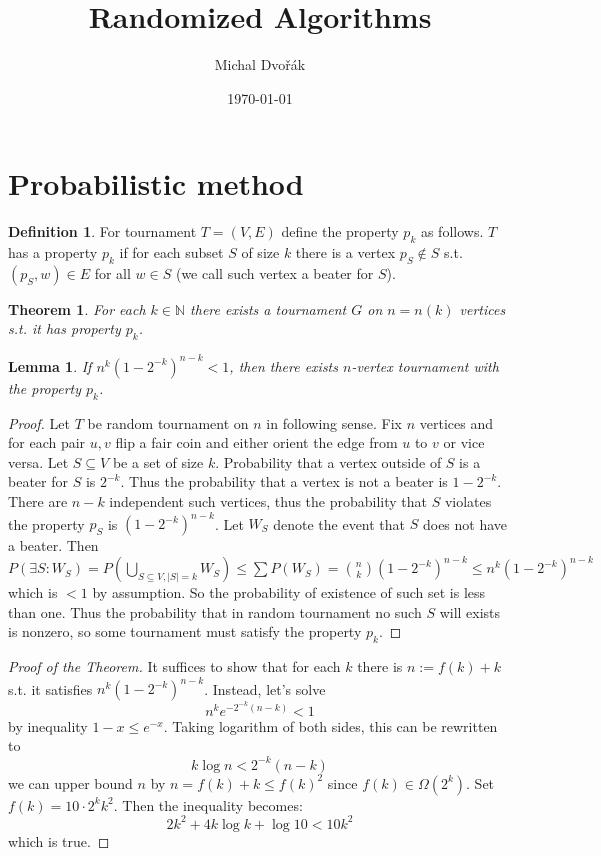 \documentclass{article}
\title{Randomized Algorithms}
\author{Michal Dvořák}
\date{\today}
\theoremstyle{plain}
\newtheorem{thm}{Theorem}
\newtheorem{lem}{Lemma}[thm]
\theoremstyle{definition}
\newtheorem{defn}{Definition}
\begin{document}
\maketitle

\section{Probabilistic method}

\begin{defn}
	For tournament $T=(V,E)$ define the property $p_k$ as follows. $T$ has a property $p_k$ if for each subset $S$ of size $k$ there is a vertex $p_S\notin S$ s.t. $(p_S,w)\in E$ for all $w\in S$ (we call such vertex a beater for $S$). 
\end{defn}

\begin{thm}
	For each $k\in\mathbb{N}$ there exists a tournament $G$ on $n=n(k)$ vertices s.t. it has property $p_k$.
\end{thm}

\begin{lem}
	If $n^k(1-2^{-k})^{n-k} < 1$, then there exists $n$-vertex tournament with the property $p_k$.
\end{lem}
\begin{proof}
	Let $T$ be random tournament on $n$ in following sense. Fix $n$ vertices and for each pair $u,v$ flip a fair coin and either orient the edge from $u$ to $v$ or vice versa. Let $S\subseteq V$ be a set of size $k$. Probability that a vertex outside of $S$ is a beater for $S$ is $2^{-k}$. Thus the probability that a vertex is not a beater is $1-2^{-k}$. There are $n-k$ independent such vertices, thus the probability that $S$ violates the property $p_S$ is $(1-2^{-k})^{n-k}$. Let $W_S$ denote the event that $S$ does not have a beater. Then $P(\exists S: W_S) = P(\bigcup_{S\subseteq V,|S|=k}W_S)\leq \sum P(W_S) = {n \choose k}(1-2^{-k})^{n-k}\leq n^k(1-2^{-k})^{n-k}$ which is $<1$ by assumption. So the probability of existence of such set is less than one. Thus the probability that in random tournament no such $S$ will exists is nonzero, so some tournament must satisfy the property $p_k$.
\end{proof}

\begin{proof}[Proof of the Theorem]
	It suffices to show that for each $k$ there is $n:=f(k)+k$ s.t. it satisfies $n^k(1-2^{-k})^{n-k}$. Instead, let's solve
	$$
	n^ke^{-2^{-k}(n-k)}<1
	$$
	by inequality $1-x\leq e^{-x}$. Taking logarithm of both sides, this can be rewritten to
	$$
	k\log n < 2^{-k}(n-k)
	$$
	we can upper bound $n$ by $n=f(k)+k\leq f(k)^2$ since $f(k)\in \Omega(2^k)$. Set $f(k)=10\cdot 2^kk^2$. Then the inequality becomes:
	$$
	2k^2+4k\log k + \log 10 < 10 k^2
	$$
	which is true.
\end{proof}
\end{document}
